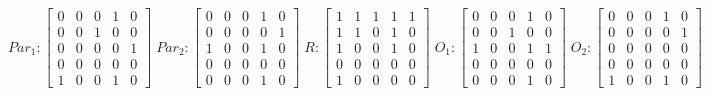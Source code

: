      $$
        Par_{1} : \begin{bmatrix}
            0 & 0 & 0 & 1 & 0 \\
            0 & 0 & 1 & 0 & 0 \\
            0 & 0 & 0 & 0 & 1 \\
			0 & 0 & 0 & 0 & 0 \\
            1 & 0 & 0 & 1 & 0 
        \end{bmatrix}
        \;
        Par_{2} : \begin{bmatrix}
            0 & 0 & 0 & 1 & 0 \\
            0 & 0 & 0 & 0 & 1 \\
            1 & 0 & 0 & 1 & 0 \\
            0 & 0 & 0 & 0 & 0 \\
            0 & 0 & 0 & 1 & 0
        \end{bmatrix}
        \;
        R : \begin{bmatrix}
            1 & 1 & 1 & 1 & 1 \\
            1 & 1 & 0 & 1 & 0 \\
            1 & 0 & 0 & 1 & 0 \\
            0 & 0 & 0 & 0 & 0 \\
            1 & 0 & 0 & 0 & 0
        \end{bmatrix}
        \;
        O_{1} : \begin{bmatrix}
            0 & 0 & 0 & 1 & 0 \\
            0 & 0 & 1 & 0 & 0 \\
            1 & 0 & 0 & 1 & 1 \\
            0 & 0 & 0 & 0 & 0 \\
            0 & 0 & 0 & 1 & 0
        \end{bmatrix}
        \;
        O_{2} : \begin{bmatrix}
            0 & 0 & 0 & 1 & 0 \\
            0 & 0 & 0 & 0 & 1 \\
            0 & 0 & 0 & 0 & 0 \\
            0 & 0 & 0 & 0 & 0 \\
            1 & 0 & 0 & 1 & 0
        \end{bmatrix}
    $$ 
